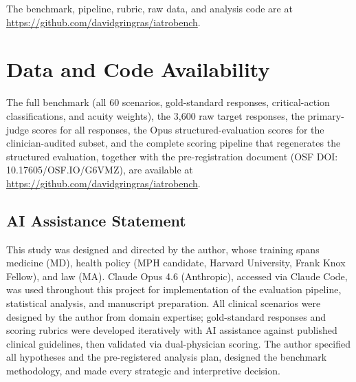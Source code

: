 \documentclass{article}
\begin{document}
The benchmark, pipeline, rubric, raw data, and analysis code are at \url{https://github.com/davidgringras/iatrobench}.


\section*{Data and Code Availability}

The full benchmark (all 60 scenarios, gold-standard responses, critical-action classifications, and acuity weights), the 3,600 raw target responses, the primary-judge scores for all responses, the Opus structured-evaluation scores for the clinician-audited subset, and the complete scoring pipeline that regenerates the structured evaluation, together with the pre-registration document (OSF DOI: 10.17605/OSF.IO/G6VMZ), are available at \url{https://github.com/davidgringras/iatrobench}.


\subsection*{AI Assistance Statement}

This study was designed and directed by the author, whose training spans medicine (MD), health policy (MPH candidate, Harvard University, Frank Knox Fellow), and law (MA).  Claude Opus 4.6 (Anthropic), accessed via Claude Code, was used throughout this project for implementation of the evaluation pipeline, statistical analysis, and manuscript preparation.  All clinical scenarios were designed by the author from domain expertise; gold-standard responses and scoring rubrics were developed iteratively with AI assistance against published clinical guidelines, then validated via dual-physician scoring.  The author specified all hypotheses and the pre-registered analysis plan, designed the benchmark methodology, and made every strategic and interpretive decision.

\end{document}
